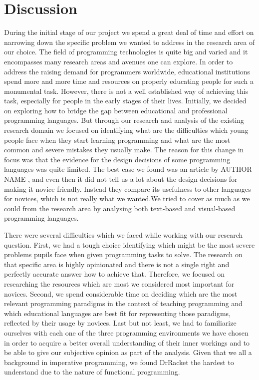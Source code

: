 \chapter{Discussion}
\label{chap:discussion}

During the initial stage of our project we spend a great deal of time and effort on narrowing down the specific problem we wanted to address in the research area of our choice. The field of programming technologies is quite big and varied and it encompasses many research areas and avenues one can explore. In order to address  the raising demand for programmers worldwide, educational institutions spend more and more time and resources on properly educating people for such a monumental task. However, there is not a well established way of achieving this task, especially for people in the early stages of their lives. Initially, we decided on exploring how to bridge the gap between educational and professional programming languages. But through our research and analysis of the existing research domain we  focused on identifying what are the difficulties which young people face when they start learning programming and what are the most common and severe mistakes they usually make. The reason for this change in focus was that the evidence for the design decisions of some programming languages was quite limited. The best case we found was an article by AUTHOR NAME , and even then it did not tell us a lot about the design decisions for making it novice friendly. Instead they compare its usefulness to other languages for novices, which is not really what we wanted.We tried to cover as much as we could from the research area by analysing both text-based and visual-based programming languages. 

There were several difficulties which we faced while working with our research question. First, we had a tough choice identifying which might be the most severe problems pupils face when given programming tasks to solve. The research on that specific area is highly opinionated and there is not a single right and perfectly accurate answer how to achieve that. Therefore, we focused on researching the resources which are most we considered most important for novices. Second, we spend considerable time on deciding which are the most relevant programming paradigms in the context of teaching programming and which educational languages are best fit for representing those paradigms, reflected by their usage by novices. Last but not least, we had to familiarize ourselves with each one of the three programming environments we have chosen in order to acquire a better overall understanding of their inner workings and to be able to give our subjective opinion as part of the analysis. Given that we all a background in imperative programming, we found DrRacket the hardest to understand due to the nature of functional programming.

